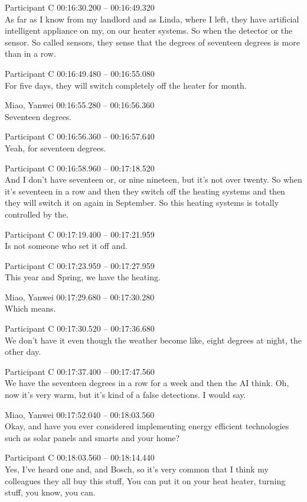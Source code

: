 {Participant C 00:16:30.200 -- 00:16:49.320 \\
As far as I know from my landlord and as Linda, where I left, they have artificial intelligent appliance on my, on our heater systems. So when the detector or the sensor. So called sensors, they sense that the degrees of seventeen degrees is more than in a row.

Participant C 00:16:49.480 -- 00:16:55.080 \\
For five days, they will switch completely off the heater for month.

Miao, Yanwei 00:16:55.280 -- 00:16:56.360 \\
Seventeen degrees.

Participant C 00:16:56.360 -- 00:16:57.640 \\
Yeah, for seventeen degrees.

Participant C 00:16:58.960 -- 00:17:18.520 \\
And I don't have seventeen or, or nine nineteen, but it's not over twenty. So when it's seventeen in a row and then they switch off the heating systems and then they will switch it on again in September. So this heating systems is totally controlled by the.

Participant C 00:17:19.400 -- 00:17:21.959 \\
Is not someone who set it off and.

Participant C 00:17:23.959 -- 00:17:27.959 \\
This year and Spring, we have the heating.

Miao, Yanwei 00:17:29.680 -- 00:17:30.280 \\
Which means.

Participant C 00:17:30.520 -- 00:17:36.680 \\
We don't have it even though the weather become like, eight degrees at night, the other day.

Participant C 00:17:37.400 -- 00:17:47.560 \\
We have the seventeen degrees in a row for a week and then the AI think. Oh, now it's very warm, but it's kind of a false detections. I would say.

Miao, Yanwei 00:17:52.040 -- 00:18:03.560 \\
Okay, and have you ever considered implementing energy efficient technologies such as solar panels and smarts and your home?

Participant C 00:18:03.560 -- 00:18:14.440 \\
Yes, I've heard one and, and Bosch, so it's very common that I think my colleagues they all buy this stuff, You can put it on your heat heater, turning stuff, you know, you can.

}
